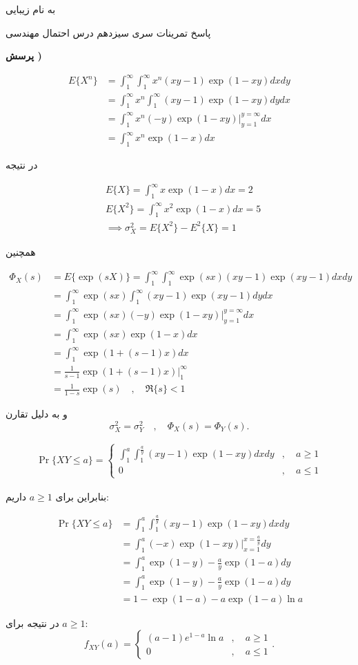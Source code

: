 \documentclass{article}
\newcounter{questionnumber}
\newcommand{\Q}{
\textbf{پرسش \thequestionnumber)}
\stepcounter{questionnumber}
}
\newcommand{\eqn}[1]{
\begin{equation}\begin{split}
#1
\end{split}\end{equation}
}
\begin{document}
\LARGE
\begin{center}

به نام زیبایی


پاسخ تمرینات سری سیزدهم درس احتمال مهندسی

\end{center}
\hrulefill
\large

\Q

\eqn{
E\{X^n\}&=\int_1^\infty\int_1^\infty x^n(xy-1)\exp(1-xy)dxdy
\\&=
\int_1^\infty x^n\int_1^\infty (xy-1)\exp(1-xy)dydx
\\&=
\int_1^\infty x^n (-y)\exp(1-xy)\Big|_{y=1}^{y=\infty} dx
\\&=
\int_1^\infty x^n \exp(1-x)dx
}
در نتیجه
\eqn{
&E\{X\}=\int_1^\infty x\exp(1-x)dx=2
\\&E\{X^2\}=\int_1^\infty x^2\exp(1-x)dx=5
\\&\implies \sigma^2_X= E\{X^2\}-E^2\{X\}=1
}

همچنین
\eqn{
\Phi_X(s)&=E\{\exp(sX)\}=\int_1^\infty\int_1^\infty \exp(sx)(xy-1)\exp(xy-1)dxdy
\\&=
\int_1^\infty \exp(sx)\int_1^\infty (xy-1)\exp(xy-1)dydx
\\&=
\int_1^\infty \exp(sx)(-y)\exp(1-xy)\Big|_{y=1}^{y=\infty} dx
\\&=
\int_1^\infty \exp(sx)\exp(1-x)dx
\\&=
\int_1^\infty \exp(1+(s-1)x)dx
\\&=
\frac{1}{s-1}\exp(1+(s-1)x)\Big|_1^\infty
\\&=
\frac{1}{1-s}\exp(s)\quad,\quad \Re\{s\}<1
}
و به دلیل تقارن
$$
\sigma^2_X=\sigma^2_Y\quad,\quad \Phi_X(s)=\Phi_Y(s).
$$


\eqn{
\Pr\{XY\le a\}=\begin{cases}
\int_1^a \int_1^\frac{a}{y}(xy-1)\exp(1-xy)dxdy&,\quad a\ge 1\\
0&,\quad a\le 1
\end{cases}
}
بنابراین برای $a\ge 1$ داریم:
\eqn{
\Pr\{XY\le a\}&=\int_1^a \int_1^\frac{a}{y}(xy-1)\exp(1-xy)dxdy
\\&=
\int_1^a (-x)\exp(1-xy)\Big|_{x=1}^{x=\frac{a}{y}}dy
\\&=
\int_1^a \exp(1-y)-\frac{a}{y}\exp(1-a)dy
\\&=
\int_1^a \exp(1-y)-\frac{a}{y}\exp(1-a)dy
\\&=
1-\exp(1-a)-a\exp(1-a)\ln a
}
در نتیجه برای $a\ge 1$:
$$
f_{XY}(a)=\begin{cases}
(a-1)e^{1-a}\ln a&,\quad a\ge 1\\
0&,\quad a\le 1
\end{cases}
.
$$
\end{document}
